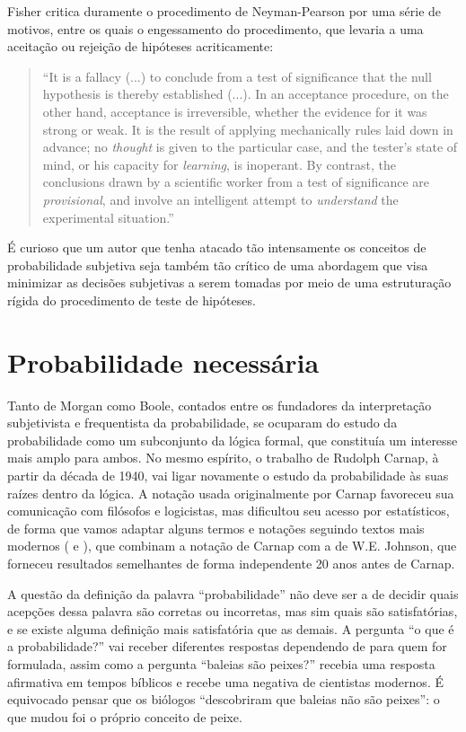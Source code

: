 Fisher critica duramente o procedimento de Neyman-Pearson por uma série de motivos, entre os quais o engessamento do procedimento,
que levaria a uma aceitação ou rejeição de hipóteses acriticamente:

\begin{quote}
``It is a fallacy (...) to conclude from a test of significance that the null hypothesis is thereby established (...).
In an acceptance procedure, on the other hand, acceptance is irreversible, whether the evidence for it was strong or weak.
It is the result of applying mechanically rules laid down in advance; no {\em thought} is given to the particular case,
and the tester's state of mind, or his capacity for {\em learning}, is inoperant.
By contrast, the conclusions drawn by a scientific worker from a test of significance are {\em provisional}, and involve
an intelligent attempt to {\em understand} the experimental situation.''\citep{Fisher1955}
\end{quote}

É curioso que um autor que tenha atacado tão intensamente os conceitos de probabilidade subjetiva seja também tão crítico de 
uma abordagem que visa minimizar as decisões subjetivas a serem tomadas por meio de uma estruturação rígida do procedimento
de teste de hipóteses. 

\section{Probabilidade necessária}

Tanto de Morgan como Boole, contados entre os fundadores da interpretação subjetivista e frequentista da probabilidade,
se ocuparam do estudo da probabilidade como um subconjunto da lógica formal, que constituía um interesse mais amplo para
ambos. No mesmo espírito, o trabalho de Rudolph Carnap, à partir da década de 1940, vai ligar novamente o estudo da probabilidade
às suas raízes dentro da lógica. A notação usada originalmente por Carnap favoreceu sua comunicação com filósofos e logicistas,
mas dificultou seu acesso por estatísticos, de forma que vamos adaptar alguns termos e notações seguindo textos mais
modernos (\citep{Zabell09} e \citep{Fitelson07}), que combinam a notação de Carnap com a de W.E. Johnson, que forneceu
resultados semelhantes de forma independente 20 anos antes de Carnap. 

A questão da definição da palavra ``probabilidade'' não deve ser a de decidir quais acepções dessa palavra são
corretas ou incorretas, mas sim quais são satisfatórias, e se existe alguma definição mais satisfatória que as demais.
A pergunta ``o que é a probabilidade?''
vai receber diferentes respostas dependendo de para quem for formulada, assim como a pergunta ``baleias são peixes?''
recebia uma resposta afirmativa em tempos bíblicos e recebe uma negativa de cientistas modernos. É equivocado pensar que os
biólogos ``descobriram que baleias não são peixes'': o que mudou foi o próprio conceito de peixe. 

